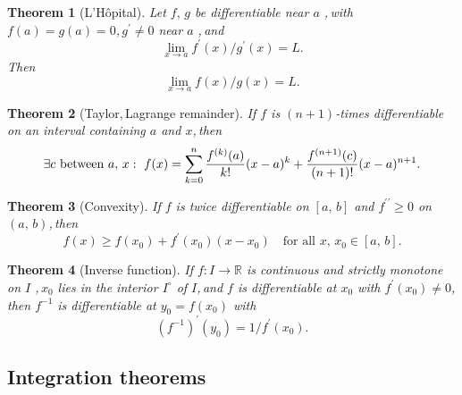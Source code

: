 \documentclass[11pt,reqno]{amsart}
\providecommand{\R}{\mathbb{R}}
\theoremstyle{redplain}
\newtheorem{theorem}{Theorem}
\begin{document}
\begin{theorem}[L'H\^opital]
\label{thm:lhopital} Let $f,\,\allowbreak g$ be differentiable near $a$%
,\,\allowbreak with $f(a)=g(a)=0$,\,\allowbreak $g^{\prime }\ne0$ near $a$%
,\,\allowbreak and 
\begin{equation*}
\lim_{x\to a}f^{\prime }(x)/g^{\prime }(x)=L.
\end{equation*}
Then 
\begin{equation}  \label{eq:lhopital}
\lim_{x\to a}f(x)/g(x)=L.
\end{equation}
\end{theorem}

\begin{theorem}[Taylor,\,\allowbreak Lagrange remainder]
\label{thm:taylor} If $f$ is $(n+1)$-times differentiable on an interval
containing $a$ and $x$,\,\allowbreak then 
\begin{equation}  \label{eq:taylor}
\exists c\ \text{between}\ a,\,\allowbreak x:\ f(x)=\sum_{k=0}^{n}\frac{%
f^{(k)}(a)}{k!}(x-a)^{k}+\frac{f^{(n+1)}(c)}{(n+1)!}(x-a)^{n+1}.
\end{equation}
\end{theorem}

\begin{theorem}[Convexity]
\label{thm:convexity} If $f$ is twice differentiable on $[a,\,\allowbreak b] 
$ and $f^{\prime \prime }\ge0$ on $(a,\,\allowbreak b)$,\,\allowbreak then 
\begin{equation}  \label{eq:convexity}
f(x)\ge f(x_0)+f^{\prime }(x_0)(x-x_0)\quad\text{for all }x,\,\allowbreak x_0%
\in[a,\,\allowbreak b].
\end{equation}
\end{theorem}

\begin{theorem}[Inverse function]
\label{thm:inverse} If $f:I\to\R$ is continuous and strictly monotone on $I$%
,\,\allowbreak $x_0$ lies in the interior $I^\circ$ of $I$,\,\allowbreak and 
$f$ is differentiable at $x_0$ with $f^{\prime }(x_0)\ne0$,\,\allowbreak
then $f^{-1}$ is differentiable at $y_0=f(x_0)$ with 
\begin{equation}  \label{eq:inverse}
(f^{-1})^{\prime }(y_0)=1/f^{\prime }(x_0).
\end{equation}
\end{theorem}

\subsection{Integration theorems}
\end{document}
